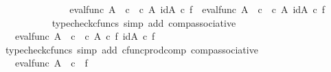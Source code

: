 \begin{isabellebody}
\ \ \ \ \ \isamarkupfalse%
{\isacharminus}{\kern0pt}\isanewline
\ \ \ \ \ \ \ \isamarkupfalse%
\ {\isachardoublequoteopen}{\isacharparenleft}{\kern0pt}eval{\isacharunderscore}{\kern0pt}func\ A\ {\isasymOmega}\ {\isasymcirc}\isactrlsub c\ {\isasymlangle}{\isasymf}\ {\isasymcirc}\isactrlsub c\ {\isasymbeta}\isactrlbsub A\isactrlbsup {\isasymOmega}\isactrlesup \isactrlesub {\isacharcomma}{\kern0pt}\ id{\isacharparenleft}{\kern0pt}A\isactrlbsup {\isasymOmega}\isactrlesup {\isacharparenright}{\kern0pt}{\isasymrangle}{\isacharparenright}{\kern0pt}\ {\isasymcirc}\isactrlsub c\ f\ {\isacharequal}{\kern0pt}\ eval{\isacharunderscore}{\kern0pt}func\ A\ {\isasymOmega}\ {\isasymcirc}\isactrlsub c\ {\isasymlangle}{\isasymf}\ {\isasymcirc}\isactrlsub c\ {\isasymbeta}\isactrlbsub A\isactrlbsup {\isasymOmega}\isactrlesup \isactrlesub {\isacharcomma}{\kern0pt}\ id{\isacharparenleft}{\kern0pt}A\isactrlbsup {\isasymOmega}\isactrlesup {\isacharparenright}{\kern0pt}{\isasymrangle}\ {\isasymcirc}\isactrlsub c\ f{\isachardoublequoteclose}\isanewline
\ \ \ \ \ \ \ \ \ \isamarkupfalse%
\ {\isacharparenleft}{\kern0pt}typecheck{\isacharunderscore}{\kern0pt}cfuncs{\isacharcomma}{\kern0pt}\ simp\ add{\isacharcolon}{\kern0pt}\ comp{\isacharunderscore}{\kern0pt}associative{}{\isacharparenright}{\kern0pt}\isanewline
\ \ \ \ \ \ \ \isamarkupfalse%
\ \isamarkupfalse%
\ {\isachardoublequoteopen}{\isachardot}{\kern0pt}{\isachardot}{\kern0pt}{\isachardot}{\kern0pt}\ {\isacharequal}{\kern0pt}\ eval{\isacharunderscore}{\kern0pt}func\ A\ {\isasymOmega}\ {\isasymcirc}\isactrlsub c\ {\isasymlangle}{\isasymf}\ {\isasymcirc}\isactrlsub c\ {\isasymbeta}\isactrlbsub A\isactrlbsup {\isasymOmega}\isactrlesup \isactrlesub \ {\isasymcirc}\isactrlsub c\ f{\isacharcomma}{\kern0pt}\ id{\isacharparenleft}{\kern0pt}A\isactrlbsup {\isasymOmega}\isactrlesup {\isacharparenright}{\kern0pt}\ {\isasymcirc}\isactrlsub c\ f{\isasymrangle}{\isachardoublequoteclose}\isanewline
\ \ \ \ \ \ \ \ \ \isamarkupfalse%
\ {\isacharparenleft}{\kern0pt}typecheck{\isacharunderscore}{\kern0pt}cfuncs{\isacharcomma}{\kern0pt}\ simp\ add{\isacharcolon}{\kern0pt}\ cfunc{\isacharunderscore}{\kern0pt}prod{\isacharunderscore}{\kern0pt}comp\ comp{\isacharunderscore}{\kern0pt}associative{}{\isacharparenright}{\kern0pt}\isanewline
\ \ \ \ \ \ \ \isamarkupfalse%
\ \isamarkupfalse%
\ {\isachardoublequoteopen}{\isachardot}{\kern0pt}{\isachardot}{\kern0pt}{\isachardot}{\kern0pt}\ {\isacharequal}{\kern0pt}\ eval{\isacharunderscore}{\kern0pt}func\ A\ {\isasymOmega}\ {\isasymcirc}\isactrlsub c\ {\isasymlangle}{\isasymf}{\isacharcomma}{\kern0pt}\ f{\isasymrangle}{\isachardoublequoteclose}\isanewline

\end{isabellebody}
